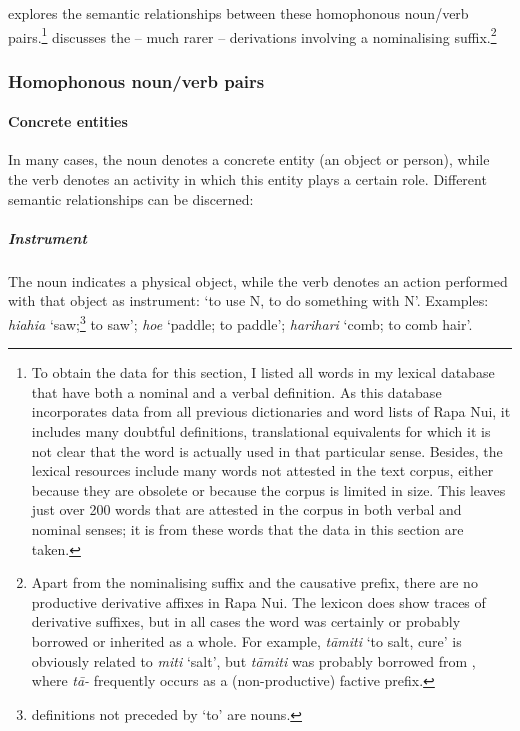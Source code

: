 \newpage 
{} explores the semantic relationships between these homophonous noun/verb pairs.\footnote{\label{fn:98}To obtain the data for this section, I listed all words in my lexical database that have both a nominal and a verbal definition. As this database incorporates data from all previous dictionaries and word lists of Rapa Nui, it includes many doubtful definitions, translational equivalents for which it is not clear that the word is actually used in that particular sense. Besides, the lexical resources include many words not attested in the text corpus, either because they are obsolete or because the corpus is limited in size. This leaves just over 200 words that are attested in the corpus in both verbal and nominal senses; it is from these words that the data in this section are taken.}  discusses the – much rarer – derivations involving a nominalising suffix.\footnote{\label{fn:99}Apart from the nominalising suffix and the causative prefix, there are no productive derivative affixes in Rapa Nui. The lexicon does show traces of derivative suffixes, but in all cases the word was certainly or probably borrowed or inherited as a whole. For example, \textit{tāmiti} ‘to salt, cure’ is obviously related to \textit{miti} ‘salt’, but \textit{tāmiti} was probably borrowed from , where \textit{tā-} frequently occurs as a (non-productive) factive prefix.} 

\subsubsection[Homophonous noun/verb pairs]{Homophonous noun/verb pairs}\label{sec:3.2.2.1}

\paragraph{Concrete entities}\label{sec:3.2.2.1.1} In many cases, the noun denotes a concrete entity (an object or person), while the verb denotes an activity in which this entity plays a certain role. Different semantic relationships can be discerned:

\subparagraph{Instrument} The noun indicates a physical object, while the verb denotes an action performed with that object as instrument: ‘to use N, to do something with N’. Examples: \textit{hiahia} ‘saw;\footnote{\label{fn:100} definitions not preceded by ‘to’ are nouns.} to saw’; \textit{hoe} ‘paddle; to paddle’; \textit{harihari} ‘comb; to comb hair’. 

